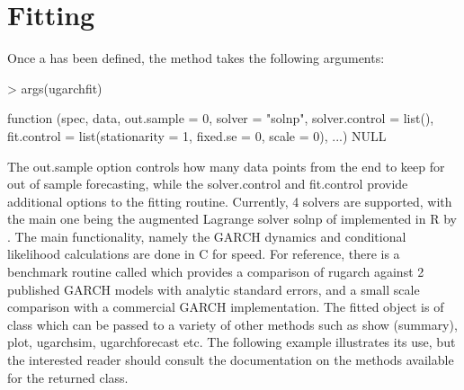\section{Fitting}\label{section:fitting}
Once a \verb@uGARCHspec@ has been defined, the \verb@ugarchfit@ method takes
the following arguments:
\begin{Schunk}
\begin{Sinput}
> args(ugarchfit)
\end{Sinput}
\begin{Soutput}
function (spec, data, out.sample = 0, solver = "solnp", solver.control = list(),
    fit.control = list(stationarity = 1, fixed.se = 0, scale = 0),
    ...)
NULL
\end{Soutput}
\end{Schunk}
The out.sample option controls how many data points from the end to keep for out
of sample forecasting, while the solver.control and fit.control provide additional
options to the fitting routine. Currently, 4 solvers are supported, with the main
one being the augmented Lagrange solver solnp of \citet{Ye} implemented in R by
\citet{Ghalanos1}. The main functionality, namely the GARCH dynamics and
conditional likelihood calculations are done in C for speed. For reference, there
is a benchmark routine called \verb@ugarchbench@ which provides a comparison of
rugarch against 2 published GARCH models with analytic standard errors, and a
small scale comparison with a commercial GARCH implementation.
The fitted object is of class \verb@uGARCHfit@ which can be passed to a variety
of other methods such as show (summary), plot, ugarchsim, ugarchforecast etc.
The following example illustrates its use, but the interested reader should
consult the documentation on the methods available for the returned class.
